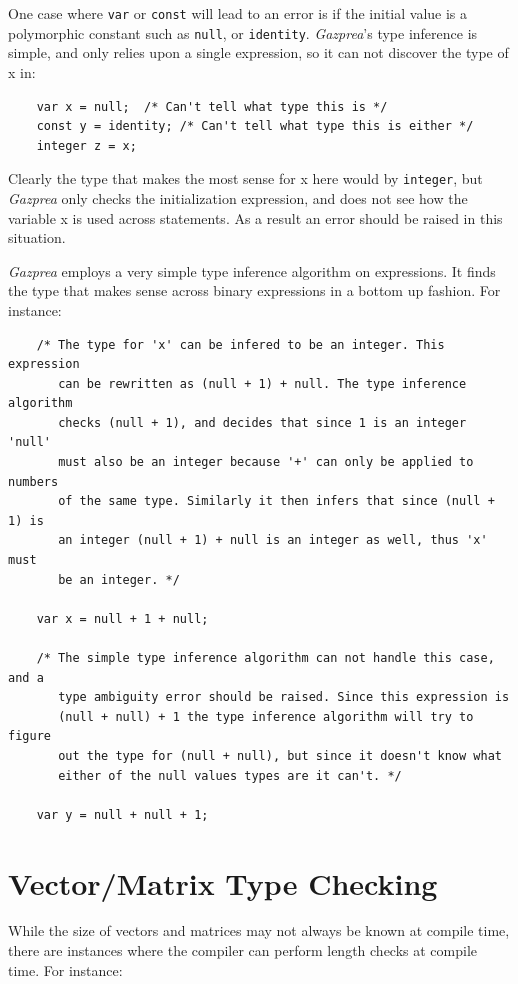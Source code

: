 \documentclass{article}
\begin{document}
  One case where \texttt{var} or \texttt{const} will lead to an error is if the initial value is a polymorphic
  constant such as \texttt{null}, or \texttt{identity}.  \textit{Gazprea}'s type inference is simple, and only relies
  upon a single expression, so it can not discover the type of x in:

  \begin{lstlisting}
    var x = null;  /* Can't tell what type this is */
    const y = identity; /* Can't tell what type this is either */
    integer z = x;
  \end{lstlisting}

  Clearly the type that makes the most sense for x here would by \texttt{integer}, but \textit{Gazprea} only checks the
  initialization expression, and does not see how the variable x is used across statements. As a result an error
  should be raised in this situation.

  \textit{Gazprea} employs a very simple type inference algorithm on expressions.  It finds the type that makes sense
  across binary expressions in a bottom up fashion. For instance:

  \begin{lstlisting}
    /* The type for 'x' can be infered to be an integer. This expression
       can be rewritten as (null + 1) + null. The type inference algorithm
       checks (null + 1), and decides that since 1 is an integer 'null'
       must also be an integer because '+' can only be applied to numbers
       of the same type. Similarly it then infers that since (null + 1) is
       an integer (null + 1) + null is an integer as well, thus 'x' must
       be an integer. */

    var x = null + 1 + null;

    /* The simple type inference algorithm can not handle this case, and a
       type ambiguity error should be raised. Since this expression is
       (null + null) + 1 the type inference algorithm will try to figure
       out the type for (null + null), but since it doesn't know what
       either of the null values types are it can't. */

    var y = null + null + 1;
  \end{lstlisting}

\section{Vector/Matrix Type Checking}\label{sec:typeChecking}


  While the size of vectors and matrices may not always be known at compile time, there are instances where the
  compiler can perform length checks at compile time. For instance:
\end{document}
